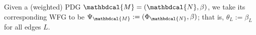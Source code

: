 \documentclass[letterpaper]{article} %
\theoremstyle{plain}
\newtheorem{theorem}{Theorem}[section]
\theoremstyle{definition}
\theoremstyle{remark}
\newcommand{\begthm}[3][]{\begin{#2}[{name=#1},restate=#3,label=#3]}
\newcommand{\commentout}[1]{\ignorespaces}
\newcommand{\thickD}{I\mkern-8muD}
\newcommand{\kldiv}{\thickD\infdivx}
\newcommand{\dg}[1]{\mathbdcal{#1}}
\newcommand{\WFGof}[1]{\Psi_{{#1}}}
\newcommand{\FGof}[1]{\Phi_{{#1}}}
\newcommand\GFE{\mathit{G\mkern-4mu F\mkern-4.5mu E}}
\begin{document}
\begin{defn}
Given a (weighted) PDG $\dg M =
(\dg N, \beta)$, we take its corresponding WFG to be $\WFGof{\dg M} :=
(\FGof{\dg N}, \beta)$; that is, $\theta_L := \beta_L$ for all edges $L$.
\end{defn}




\commentout{
\begthm{theorem}{thm:pdg-is-fg2}
If $\dg M$ is a PDG such that for some $\gamma >0$, we have that
	$\beta_L = \alpha_L \gamma$ for all  
	$L$, then
	$\bbr{\dg M}_{\gamma} = \gamma\,\GFE_{\Phi_{\dg M}} $ and
	$\bbr{\dg M}_{\gamma}^* = \{\Pr_{\Phi_{\dg M}} \}$.
\end{theorem}




}
\end{document}
